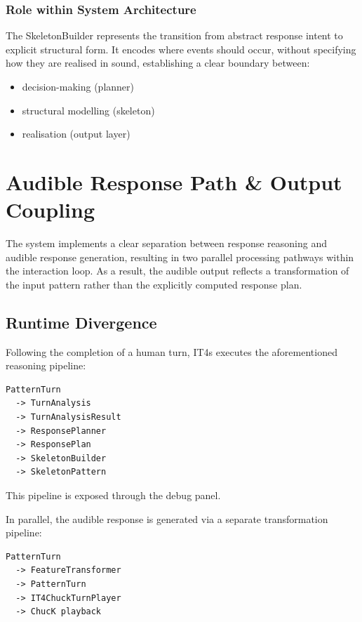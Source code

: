 \subsubsection{Role within System Architecture}\label{role-within-system-architecture}

The SkeletonBuilder represents the transition from abstract response
intent to explicit structural form. It encodes where events should
occur, without specifying how they are realised in sound, establishing a
clear boundary between:

\begin{itemize}
\item
  decision-making (planner)
\item
  structural modelling (skeleton)
\item
  realisation (output layer)
\end{itemize}

\section{Audible Response Path \& Output Coupling}\label{audible-response-path-output-coupling}

The system implements a clear separation between response reasoning and
audible response generation, resulting in two parallel processing
pathways within the interaction loop. As a result, the audible output
reflects a transformation of the input pattern rather than the
explicitly computed response plan.

\subsection{Runtime Divergence}\label{runtime-divergence}

Following the completion of a human turn, IT4s executes the
aforementioned reasoning pipeline:

\begin{lstlisting}
PatternTurn
  -> TurnAnalysis
  -> TurnAnalysisResult
  -> ResponsePlanner
  -> ResponsePlan
  -> SkeletonBuilder
  -> SkeletonPattern
\end{lstlisting}

This pipeline is exposed through the debug panel.

In parallel, the audible response is generated via a separate
transformation pipeline:

\begin{lstlisting}
PatternTurn
  -> FeatureTransformer
  -> PatternTurn
  -> IT4ChuckTurnPlayer
  -> ChucK playback
\end{lstlisting}

